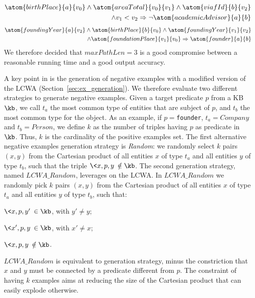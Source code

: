 {\scriptsize
	\begin{gather}
		\begin{split}
		\atom{birthPlace}{a}{v_0} \wedge \atom{areaTotal}{v_0}{v_1} \wedge \atom{viafId}{b}{v_2}\\ \wedge v_1 < v_2 \Rightarrow \neg \atom{academicAdvisor}{a}{b} \\
		\end{split}
	\end{gather}
	\begin{gather}
		\begin{split}
		\atom{foundingYear}{a}{v_2} \wedge \atom{birthPlace}{b}{v_0} \wedge \atom{foundingYear}{v_1}{v_2}\\  \wedge \atom{foundationPlace}{v_1}{v_0} \Rightarrow \atom{founder}{a}{b}
		\end{split}
	\end{gather}
}
We therefore decided that $maxPathLen=3$ is a good compromise between a reasonable running time and a good output accuracy.

A key point in \krd is the generation of negative examples with a modified version of the LCWA (Section~\ref{sec:ex_generation}). We therefore evaluate two different strategies to generate negative examples. Given a target predicate $p$ from a KB $\kb$, we call $t_a$ the most common type of entities that are subject of $p$, and $t_b$ the most common type for the object. As an example, if $p=$\texttt{founder}, $t_a=Company$ and $t_b=Person$, we define $k$ as the number of triples having $p$ as predicate in $\kb$. Thus, $k$ is the cardinality of the positive examples set. The first alternative negative examples generation strategy is \emph{Random}: we randomly select $k$ pairs $(x,y)$ from the Cartesian product of all entities $x$ of type $t_a$ and all entities $y$ of type $t_b$, such that the triple $\<x,p,y\> \notin \kb$. The second generation strategy, named ${LCWA}\_Random$, leverages on the LCWA. In $LCWA\_Random$ we randomly pick $k$ pairs $(x,y)$ from the Cartesian product of all entities $x$ of type $t_a$ and all entities $y$ of type $t_b$, such that:
\begin{inparaenum}[\itshape(i)]
	\item $\<x,p,y'\> \in \kb$, with $y' \neq y$;
	\item $\<x',p,y\> \in \kb$, with $x' \neq x$;
	\item $\<x,p,y\> \notin \kb$.
\end{inparaenum}
$LCWA\_Random$ is equivalent to \krd generation strategy, minus the constriction that $x$ and $y$ must be connected by a predicate different from $p$. The constraint of having $k$ examples aims at reducing the size of the Cartesian product that can easily explode otherwise.

